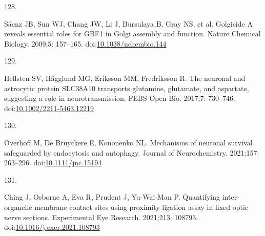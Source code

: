 \documentclass[
  12pt,
  a4paper,
]{book}
\newlength{\cslhangindent}
\newlength{\csllabelwidth}
\newlength{\cslentryspacingunit} %
\newenvironment{CSLReferences}[2] %
 {%
  \setlength{\parindent}{0pt}
  \ifodd #1
  \let\oldpar\par
  \def\par{\hangindent=\cslhangindent\oldpar}
  \fi
  \setlength{\parskip}{#2\cslentryspacingunit}
 }%
 {}
\newcommand{\CSLLeftMargin}[1]{\parbox[t]{\csllabelwidth}{#1}}
\newcommand{\CSLRightInline}[1]{\parbox[t]{\linewidth - \csllabelwidth}{#1}\break}
\begin{document}
\begin{CSLReferences}{0}{0}
\leavevmode{}%
\CSLLeftMargin{128. }%
\CSLRightInline{Sáenz JB, Sun WJ, Chang JW, Li J, Bursulaya B, Gray NS, et al. Golgicide {A} reveals essential roles for {GBF1} in {Golgi} assembly and function. Nature Chemical Biology. 2009;5: 157--165. doi:\href{https://doi.org/10.1038/nchembio.144}{10.1038/nchembio.144}}

\leavevmode{}%
\CSLLeftMargin{129. }%
\CSLRightInline{Hellsten SV, Hägglund MG, Eriksson MM, Fredriksson R. The neuronal and astrocytic protein {SLC38A10} transports glutamine, glutamate, and aspartate, suggesting a role in neurotransmission. FEBS Open Bio. 2017;7: 730--746. doi:\href{https://doi.org/10.1002/2211-5463.12219}{10.1002/2211-5463.12219}}

\leavevmode{}%
\CSLLeftMargin{130. }%
\CSLRightInline{Overhoff M, De Bruyckere E, Kononenko NL. Mechanisms of neuronal survival safeguarded by endocytosis and autophagy. Journal of Neurochemistry. 2021;157: 263--296. doi:\href{https://doi.org/10.1111/jnc.15194}{10.1111/jnc.15194}}

\leavevmode{}%
\CSLLeftMargin{131. }%
\CSLRightInline{Ching J, Osborne A, Eva R, Prudent J, Yu-Wai-Man P. Quantifying inter-organelle membrane contact sites using proximity ligation assay in fixed optic nerve sections. Experimental Eye Research. 2021;213: 108793. doi:\href{https://doi.org/10.1016/j.exer.2021.108793}{10.1016/j.exer.2021.108793}}

\end{CSLReferences}
\end{document}
